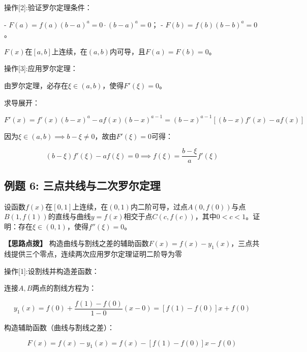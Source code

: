 \documentclass[11pt,a4paper,UTF8]{ctexart}
\begin{document}
操作[2]:验证罗尔定理条件：

\begin{solbox}[分步推导与答题规范]
- $F(a) = f(a)(b - a)^a = 0 \cdot (b - a)^a = 0$；
- $F(b) = f(b)(b - b)^a = 0$。

$F(x)$在$[a, b]$上连续，在$(a, b)$内可导，且$F(a) = F(b) = 0$。
\end{solbox}

操作[3]:应用罗尔定理：

\begin{solbox}[分步推导与答题规范]
由罗尔定理，必存在$\xi \in (a, b)$，使得$F'(\xi) = 0$。

求导展开：


\begin{equation*}
F'(x) = f'(x)(b - x)^a - a f(x)(b - x)^{a-1} = (b - x)^{a-1} \left[(b - x)f'(x) - a f(x)\right]
\end{equation*}


因为$\xi \in (a, b) \implies b - \xi \neq 0$，故由$F'(\xi) = 0$可得：


\begin{equation*}
(b - \xi)f'(\xi) - a f(\xi) = 0 \implies f(\xi) = \frac{b - \xi}{a} f'(\xi)
\end{equation*}

\end{solbox}


\subsection{例题 6: 三点共线与二次罗尔定理}

设函数$f(x)$在$[0, 1]$上连续，在$(0, 1)$内二阶可导，过点$A(0, f(0))$与点$B(1, f(1))$的直线与曲线$y = f(x)$相交于点$C(c, f(c))$，其中$0 < c < 1$。证明：存在$\xi \in (0, 1)$，使得$f''(\xi) = 0$。

\textbf{\color{DeepPurple}【思路点拨】} 构造曲线与割线之差的辅助函数$F(x) = f(x) - y_1(x)$，三点共线提供三个零点，连续两次应用罗尔定理证明二阶导为零


操作[1]:设割线并构造差函数：

\begin{solbox}[分步推导与答题规范]
连接$A, B$两点的割线方程为：


\begin{equation*}
y_1(x) = f(0) + \frac{f(1) - f(0)}{1 - 0}(x - 0) = [f(1) - f(0)]x + f(0)
\end{equation*}


构造辅助函数（曲线与割线之差）：


\begin{equation*}
F(x) = f(x) - y_1(x) = f(x) - [f(1) - f(0)]x - f(0)
\end{equation*}

\end{solbox}
\end{document}
